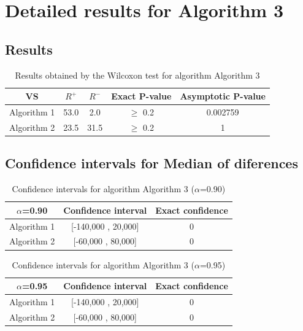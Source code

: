 \documentclass[a4paper,10pt]{article}
\begin{document}
 \clearpage 


\section{Detailed results for Algorithm 3}


\subsection{Results}

\begin{table}[!htp]
\centering\small
\begin{tabular}{
|c|c|c|c|c|}
\hline
 VS & $R^{+}$ & $R^{-}$ & Exact P-value & Asymptotic P-value \\ \hline 
Algorithm 1 & 53.0 & 2.0 & $\geq$ 0.2 & 0.002759\\ \hline 
Algorithm 2 & 23.5 & 31.5 & $\geq$ 0.2 & 1\\ \hline 

\end{tabular}
\caption{Results obtained by the Wilcoxon test for algorithm Algorithm 3}
\end{table}

\subsection{Confidence intervals for Median of diferences}

\begin{table}[!htp]
\centering\small
\begin{tabular}{
|c|c|c|}
\hline
 $\alpha$=0.90 & Confidence interval & Exact confidence \\ \hline 
Algorithm 1 & [-140,000 , 20,000] & 0\\ \hline 
Algorithm 2 & [-60,000 , 80,000] & 0\\ \hline 

\end{tabular}
\caption{Confidence intervals for algorithm Algorithm 3 ($\alpha$=0.90)}
\end{table}
\begin{table}[!htp]
\centering\small
\begin{tabular}{
|c|c|c|}
\hline
 $\alpha$=0.95 & Confidence interval & Exact confidence \\ \hline 
Algorithm 1 & [-140,000 , 20,000] & 0\\ \hline 
Algorithm 2 & [-60,000 , 80,000] & 0\\ \hline 

\end{tabular}
\caption{Confidence intervals for algorithm Algorithm 3 ($\alpha$=0.95)}
\end{table}

 \clearpage 
\end{document}

